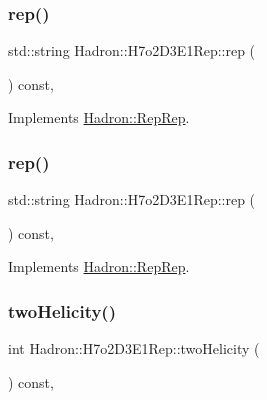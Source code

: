 \subsubsection{\texorpdfstring{rep()}{rep()}\hspace{0.1cm}{\footnotesize\ttfamily [4/5]}}
{\footnotesize\ttfamily std\+::string Hadron\+::\+H7o2\+D3\+E1\+Rep\+::rep (\begin{DoxyParamCaption}{ }\end{DoxyParamCaption}) const\hspace{0.3cm}{\ttfamily [inline]}, {\ttfamily [virtual]}}



Implements \mbox{\hyperlink{structHadron_1_1RepRep_ab3213025f6de249f7095892109575fde}{Hadron\+::\+Rep\+Rep}}.

\mbox{\label{structHadron_1_1H7o2D3E1Rep_a9b7fbb0d47650cdab86b3bb9832bbe75}} 
\subsubsection{\texorpdfstring{rep()}{rep()}\hspace{0.1cm}{\footnotesize\ttfamily [5/5]}}
{\footnotesize\ttfamily std\+::string Hadron\+::\+H7o2\+D3\+E1\+Rep\+::rep (\begin{DoxyParamCaption}{ }\end{DoxyParamCaption}) const\hspace{0.3cm}{\ttfamily [inline]}, {\ttfamily [virtual]}}



Implements \mbox{\hyperlink{structHadron_1_1RepRep_ab3213025f6de249f7095892109575fde}{Hadron\+::\+Rep\+Rep}}.

\mbox{\label{structHadron_1_1H7o2D3E1Rep_af472ee043f8e74621c8a32fb43e30b5f}} 
\subsubsection{\texorpdfstring{twoHelicity()}{twoHelicity()}\hspace{0.1cm}{\footnotesize\ttfamily [1/3]}}
{\footnotesize\ttfamily int Hadron\+::\+H7o2\+D3\+E1\+Rep\+::two\+Helicity (\begin{DoxyParamCaption}{ }\end{DoxyParamCaption}) const\hspace{0.3cm}{\ttfamily [inline]}, {\ttfamily [virtual]}}

